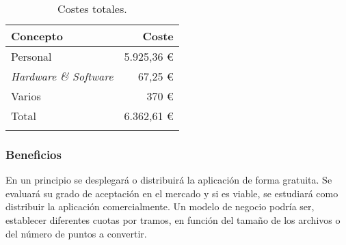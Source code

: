 \begin{longtable}[]{@{}lr@{}}
\toprule
\begin{minipage}[b]{0.4\columnwidth}\raggedright\strut
\textbf{Concepto}\strut
\end{minipage} & \begin{minipage}[b]{0.22\columnwidth}\raggedright\strut
\textbf{Coste}\strut
\end{minipage}\tabularnewline
\midrule
\endhead
\begin{minipage}[t]{0.4\columnwidth}\raggedright\strut
Personal\strut
\end{minipage} & \begin{minipage}[t]{0.22\columnwidth}\raggedright\strut
5.925,36 \euro{}\strut
\end{minipage}\tabularnewline
\begin{minipage}[t]{0.4\columnwidth}\raggedright\strut
\emph{Hardware \& Software}\strut
\end{minipage} & \begin{minipage}[t]{0.22\columnwidth}\raggedright\strut
67,25 \euro{}\strut
\end{minipage}\tabularnewline
\begin{minipage}[t]{0.4\columnwidth}\raggedright\strut
Varios\strut
\end{minipage} & \begin{minipage}[t]{0.22\columnwidth}\raggedright\strut
370 \euro{}\strut
\end{minipage}\tabularnewline
\midrule
\begin{minipage}[t]{0.4\columnwidth}\raggedright\strut
Total\strut
\end{minipage} & \begin{minipage}[t]{0.22\columnwidth}\raggedright\strut
 6.362,61 \euro{}\strut
\end{minipage}\tabularnewline
\bottomrule
\caption{Costes totales.}
\end{longtable}

\subsubsection{Beneficios}

En un principio se desplegará o distribuirá la aplicación de forma gratuita. Se evaluará su grado de aceptación en el mercado y si es viable, se estudiará como distribuir la aplicación comercialmente. Un modelo de negocio podría ser, establecer diferentes cuotas por tramos, en función del tamaño de los archivos o del número de puntos a convertir.

